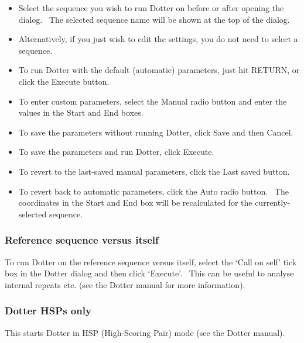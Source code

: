 \documentclass[letterpaper]{article}
\newcommand\liststyleWWviiiNumxxxvii{%
\renewcommand\labelitemi{{\textbullet}}
\renewcommand\labelitemii{o}
\renewcommand\labelitemiii{[F0A7?]}
\renewcommand\labelitemiv{[F0B7?]}
}
\begin{document}
\liststyleWWviiiNumxxxvii
\begin{itemize}
\item {
Select the sequence you wish to run Dotter on before or after opening
the dialog. \ The selected sequence name will be shown at the top of
the dialog.}
\item {
Alternatively, if you just wish to edit the settings, you do not need to
select a sequence.}
\item {
To run Dotter with the default (automatic) parameters, just hit RETURN,
or click the {\textquotesingle}Execute{\textquotesingle} button.}
\item {
To enter custom parameters, select the
{\textquotesingle}Manual{\textquotesingle} radio button and enter the
values in the {\textquotesingle}Start{\textquotesingle} and
{\textquotesingle}End{\textquotesingle} boxes.}
\item {
To save the parameters without running Dotter, click Save and then
Cancel{\textquotesingle}.}
\item {
To save the parameters and run Dotter, click
{\textquotesingle}Execute{\textquotesingle}.}
\item {
To revert to the last-saved manual parameters, click the
{\textquotesingle}Last saved{\textquotesingle} button.}
\item {
To revert back to automatic parameters, click the
{\textquotesingle}Auto{\textquotesingle} radio button. \ The
coordinates in the Start and End box will be recalculated for the
currently-selected sequence.}
\end{itemize}
{\color[rgb]{0.30980393,0.5058824,0.7411765}\subsubsection[Reference sequence versus itself]{Reference sequence
versus itself}}
\hypertarget{RefHeading2181056909880}{}{
To run Dotter on the reference sequence versus itself, select the
{\textquoteleft}Call on self{\textquoteright} tick box in the Dotter
dialog and then click {\textquoteleft}Execute{\textquoteright}. \ This
can be useful to analyse internal repeats etc. (see the Dotter manual
for more information).}

\bigskip

{\color[rgb]{0.30980393,0.5058824,0.7411765}\subsubsection[Dotter HSPs only]{Dotter HSPs only}}
\hypertarget{RefHeading2201056909880}{}{
This starts Dotter in HSP (High-Scoring Pair) mode (see the Dotter
manual).}
\end{document}
